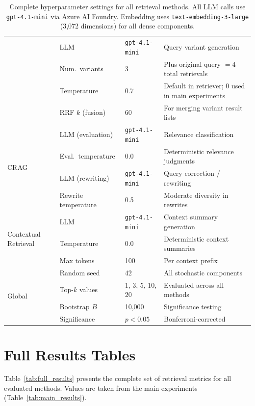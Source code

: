\documentclass[11pt]{article}
\begin{document}
\begin{table}[ht]
\begin{tabular}{llll}
  & LLM              & \texttt{gpt-4.1-mini} & Query variant generation \\
  & Num.\ variants   & 3     & Plus original query $= 4$ total retrievals \\
  & Temperature      & 0.7   & Default in retriever; 0 used in main experiments \\
  & RRF $k$ (fusion) & 60    & For merging variant result lists \\
\midrule
\multirow{4}{*}{CRAG}
  & LLM (evaluation) & \texttt{gpt-4.1-mini} & Relevance classification \\
  & Eval.\ temperature & 0.0 & Deterministic relevance judgments \\
  & LLM (rewriting)  & \texttt{gpt-4.1-mini} & Query correction / rewriting \\
  & Rewrite temperature & 0.5 & Moderate diversity in rewrites \\
\midrule
\multirow{3}{*}{Contextual Retrieval}
  & LLM              & \texttt{gpt-4.1-mini} & Context summary generation \\
  & Temperature      & 0.0   & Deterministic context summaries \\
  & Max tokens       & 100   & Per context prefix \\
\midrule
\multirow{4}{*}{Global}
  & Random seed      & 42    & All stochastic components \\
  & Top-$k$ values   & 1, 3, 5, 10, 20 & Evaluated across all methods \\
  & Bootstrap $B$    & 10{,}000 & Significance testing \\
  & Significance     & $p < 0.05$ & Bonferroni-corrected \\
\bottomrule
\end{tabular}
\caption{Complete hyperparameter settings for all retrieval methods. All LLM calls use \texttt{gpt-4.1-mini} via Azure AI Foundry. Embedding uses \texttt{text-embedding-3-large} (3,072 dimensions) for all dense components.}
\label{tab:hyperparams}
\end{table}


\section{Full Results Tables}
\label{app:full_results}

Table~\ref{tab:full_results} presents the complete set of retrieval metrics for all evaluated methods. Values are taken from the main experiments (Table~\ref{tab:main_results}).
\end{document}
